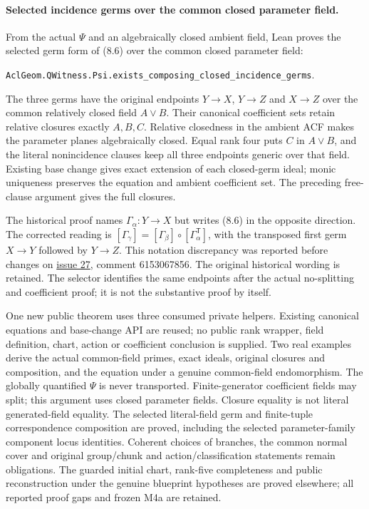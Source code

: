 \documentclass[11pt,oneside]{article}
\theoremstyle{definition}
\theoremstyle{remark}
\begin{document}
\paragraph{Selected incidence germs over the common closed parameter field.}
From the actual $\Psi$ and an algebraically closed ambient field, Lean proves
the selected germ form of (8.6) over the common closed parameter field:
\par\noindent
\texttt{AclGeom.QWitness.Psi.exists\_composing\_closed\_incidence\_germs}.
\par\noindent
The three germs have the original endpoints $Y\to X$, $Y\to Z$ and $X\to Z$
over the common relatively closed field $A\vee B$. Their canonical coefficient
sets retain relative closures exactly $A,B,C$. Relative closedness in the
ambient ACF makes the parameter planes algebraically closed. Equal rank four
puts $C$ in $A\vee B$, and the literal nonincidence clauses keep all three
endpoints generic over that field. Existing base change gives exact extension
of each closed-germ ideal; monic uniqueness preserves the equation and ambient
coefficient set. The preceding free-clause argument gives the full closures.

The historical proof names $\Gamma_\alpha:Y\to X$ but writes (8.6) in the
opposite direction. The corrected reading is
$[\Gamma_\gamma]=[\Gamma_\beta]\circ[\Gamma_\alpha^{\mathsf T}]$,
with the transposed first germ $X\to Y$ followed by $Y\to Z$.
This notation discrepancy was reported before changes on
\href{https://github.com/adamtopaz/acl_geom/issues/27}{issue 27},
comment 6153067856. The original historical wording is retained.
The selector identifies the same endpoints after the actual no-splitting
and coefficient proof; it is not the substantive proof by itself.

One new public theorem uses three consumed private helpers. Existing
canonical equations and base-change API are reused; no public rank wrapper,
field definition, chart, action or coefficient conclusion is supplied.
Two real examples derive the actual common-field primes, exact ideals,
original closures and composition, and the equation under a genuine
common-field endomorphism. The globally quantified $\Psi$ is never transported.
Finite-generator coefficient fields may split; this argument uses closed
parameter fields. Closure equality is not literal generated-field equality.
The selected literal-field germ and finite-tuple correspondence composition
are proved, including the selected parameter-family component locus identities.
Coherent choices of branches, the common normal cover and original group/chunk
and action/classification statements remain obligations. The guarded initial chart, rank-five completeness and
public reconstruction under the genuine blueprint hypotheses are proved
elsewhere; all reported proof gaps and frozen M4a are retained.
\end{document}
